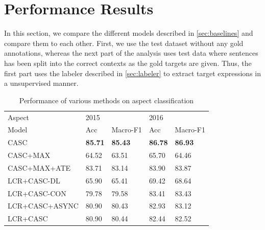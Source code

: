 \documentclass[american, oneside]{ecsgdp}
\begin{document}
\section{Performance Results} \label{sec:performance}
In this section, we compare the different models described in \cref{sec:baselines} and compare them to each other. First, we use the test dataset without any gold annotations, whereas the next part of the analysis uses test data where sentences has been split into the correct contexts as the gold targets are given. Thus, the first part uses the labeler described in \cref{sec:labeler} to extract target expressions in a unsupervised manner.

\begin{table}[htbp]
\centering
\caption{Performance of various methods on aspect classification}
\label{tab:aspect-perf}
\begin{tabular}{@{\extracolsep{4pt}}lllll@{}}
\hline
Aspect         & 2015           &                & 2016           &                \\ \cline{2-3} \cline{4-5}
Model          & Acc            & Macro-F1       & Acc            & Macro-F1       \\ \hline
CASC           & \textbf{85.71} & \textbf{85.43} & \textbf{86.78} & \textbf{86.93} \\
CASC+MAX       & 64.52          & 63.51          & 65.70          & 64.46          \\
CASC+MAX+ATE   & 83.71          & 83.14          & 83.90          & 83.87          \\
LCR+CASC-DL    & 65.90          & 65.41          & 69.42          & 68.64          \\
LCR+CASC-CON   & 79.78          & 79.58          & 83.41          & 83.43          \\
LCR+CASC+ASYNC & 80.90	        & 80.43	         &82.93	          & 83.12          \\
LCR+CASC       & 80.90          & 80.44          & 82.44          & 82.52          \\ \hline
\end{tabular}%
\end{table}
\end{document}
